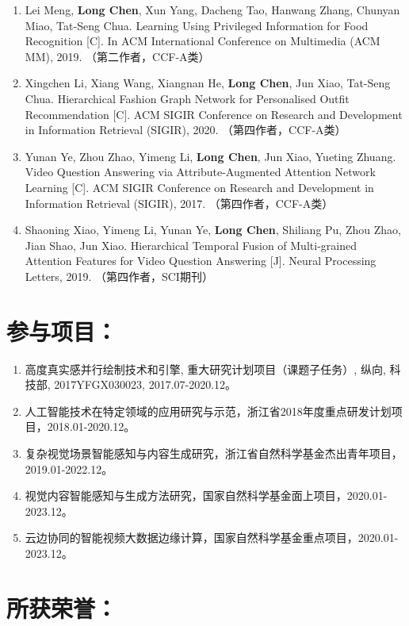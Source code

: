 \begin{publications}
\begin{enumerate}
\item{
Lei Meng, \textbf{Long Chen}, Xun Yang, Dacheng Tao, Hanwang Zhang, Chunyan Miao, Tat-Seng Chua.
Learning Using Privileged Information for Food Recognition [C].
In ACM International Conference on Multimedia (ACM MM), 2019.
（第二作者，CCF-A类）
}

\item{
Xingchen Li, Xiang Wang, Xiangnan He, \textbf{Long Chen}, Jun Xiao, Tat-Seng Chua.
Hierarchical Fashion Graph Network for Personalised Outfit Recommendation [C].
ACM SIGIR Conference on Research and Development in Information Retrieval (SIGIR), 2020.
（第四作者，CCF-A类）
}

\item{
Yunan Ye, Zhou Zhao, Yimeng Li, \textbf{Long Chen}, Jun Xiao, Yueting Zhuang.
Video Question Answering via Attribute-Augmented Attention Network Learning [C].
ACM SIGIR Conference on Research and Development in Information Retrieval (SIGIR), 2017.
（第四作者，CCF-A类）
}


\item{
Shaoning Xiao, Yimeng Li, Yunan Ye, \textbf{Long Chen}, Shiliang Pu, Zhou Zhao, Jian Shao, Jun Xiao.
Hierarchical Temporal Fusion of Multi-grained Attention Features for Video Question Answering [J]. 
Neural Processing Letters, 2019. 
（第四作者，SCI期刊）
} 
\end{enumerate}

\section*{参与项目：}
\begin{enumerate}
\item{高度真实感并行绘制技术和引擎, 重大研究计划项目（课题子任务）, 纵向, 科技部, 2017YFGX030023, 2017.07-2020.12。}
\item{人工智能技术在特定领域的应用研究与示范，浙江省2018年度重点研发计划项目，2018.01-2020.12。}
\item{复杂视觉场景智能感知与内容生成研究，浙江省自然科学基金杰出青年项目，2019.01-2022.12。}
\item{视觉内容智能感知与生成方法研究，国家自然科学基金面上项目，2020.01-2023.12。}
\item{云边协同的智能视频大数据边缘计算，国家自然科学基金重点项目，2020.01-2023.12。}
\end{enumerate}


\section*{所获荣誉：}


\end{publications}
